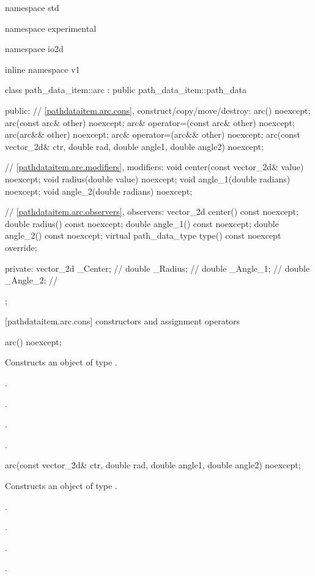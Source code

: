 \begin{codeblock}
namespace std { namespace experimental { namespace io2d { inline namespace v1 {
  class path_data_item::arc : public path_data_item::path_data {
  public:
    // \ref{pathdataitem.arc.cons}, construct/copy/move/destroy:
    arc() noexcept;
    arc(const arc& other) noexcept;
    arc& operator=(const arc& other) noexcept;
    arc(arc&& other) noexcept;
    arc& operator=(arc&& other) noexcept;
    arc(const vector_2d& ctr, double rad, double angle1, double angle2) noexcept;

    // \ref{pathdataitem.arc.modifiers}, modifiers:
    void center(const vector_2d& value) noexcept;
    void radius(double value) noexcept;
    void angle_1(double radians) noexcept;
    void angle_2(double radians) noexcept;

    // \ref{pathdataitem.arc.observers}, observers:
    vector_2d center() const noexcept;
    double radius() const noexcept;
    double angle_1() const noexcept;
    double angle_2() const noexcept;
    virtual path_data_type type() const noexcept override;

  private:
    vector_2d _Center; // \expos
    double _Radius;    // \expos
    double _Angle_1;   // \expos
    double _Angle_2;   // \expos
  };
} } } }
\end{codeblock}

 [pathdataitem.arc.cons] { constructors and assignment operators}

\begin{itemdecl}
    arc() noexcept;
\end{itemdecl}
\begin{itemdescr}
	\pnum
	\effects
	Constructs an object of type .
	
	\pnum
	\postconditions
	.

	.

	.

	.

\end{itemdescr}

\begin{itemdecl}
    arc(const vector_2d& ctr, double rad, double angle1, double angle2) noexcept;
\end{itemdecl}
\begin{itemdescr}
	\pnum
	\effects
	Constructs an object of type .
	
	\pnum
	\postconditions
	.

	.

	.

	.

\end{itemdescr}

